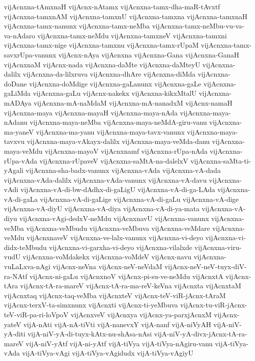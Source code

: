 {vijAcnxna-tAmxnaH
vijAcnx-nAtamx
vijAcnxna-tamx-dha-maR-tAvxtf
vijAcnxna-tamxnAM
vijAcnxna-tamxnU
vijAcnxna-tamxna
vijAcnxna-tamxnaH
vijAcnxna-tamx-nanunx
vijAcnxna-tamx-neMba
vijAcnxna-tamx-neMbu-vu-va-va-nAdaro
vijAcnxna-tamx-neMdu
vijAcnxna-tamxneV
vijAcnxna-tamxni
vijAcnxna-tamx-nige
vijAcnxna-tamxnu
vijAcnxna-tamx-rUpaM
vijAcnxna-tamx-savxrUpa-vanunx
vijAcnx-nAya
vijAcnxna
vijAcnxna-Gana
vijAcnxna-GanaH
vijAcnxnaM
vijAcnx-nada
vijAcnxna-daMte
vijAcnxna-daMteyU
vijAcnxna-dalilx
vijAcnxna-da-lilxruva
vijAcnxna-dhAre
vijAcnxna-diMda
vijAcnxna-doDane
vijAcnxna-doMdige
vijAcnxna-gaLanunx
vijAcnxna-gaLe
vijAcnxna-gaLiMda
vijAcnxna-gaLu
vijAcnx-nakekx
vijAcnxna-kikxMtalU
vijAcnxna-mADAya
vijAcnxna-mA-naMdaM
vijAcnxna-mA-nanadxM
vijAcnx-namaH
vijAcnxna-maya
vijAcnxna-mayaH
vijAcnxna-maya-nAda
vijAcnxna-maya-nAdanu
vijAcnxna-maya-neMba
vijAcnxna-maya-neMdA-giru-vanu
vijAcnxna-ma-yaneV
vijAcnxna-ma-yanu
vijAcnxna-maya-tavx-vanunx
vijAcnxna-maya-tavxvu
vijAcnxna-maya-vAkayx-dalilx
vijAcnxna-maya-veMda-danu
vijAcnxna-maya-veMdu
vijAcnxna-mayoV
vijAcnxnamf
vijAcnxna-rUpa-nAda
vijAcnxna-rUpa-vAda
vijAcnxna-rUpaveV
vijAcnxna-saMtA-na-dalelxV
vijAcnxna-saMta-ti-yAgali
vijAcnxna-sha-badx-vanunx
vijAcnxna-vAda
vijAcnxna-vA-dada
vijAcnxna-vAda-dalilx
vijAcnxna-vAda-vanunx
vijAcnxna-vA-davu
vijAcnxna-vAdi
vijAcnxna-vA-di-bw-dAdhx-di-gaLigU
vijAcnxna-vA-di-ga-LAda
vijAcnxna-vA-di-gaLa
vijAcnxna-vA-di-gaLige
vijAcnxna-vA-di-gaLu
vijAcnxna-vA-dige
vijAcnxna-vA-diyU
vijAcnxna-vA-diya
vijAcnxna-vA-di-ya-mata
vijAcnxna-vA-diyu
vijAcnxna-vAgi-dedxV-neMdu
vijAcnxnavU
vijAcnxna-vanunx
vijAcnxna-veMba
vijAcnxna-veMbudu
vijAcnxna-veMbuva
vijAcnxna-veMdare
vijAcnxna-veMdu
vijAcnxnaveV
vijAcnxna-ve-lalx-vanunx
vijAcnxna-vi-deyo
vijAcnxna-vi-didx-teMbudu
vijAcnxna-vi-garxha-vi-deyo
vijAcnxna-vilalxde
vijAcnxna-viru-vudU
vijAcnxna-voMdakekx
vijAcnxna-voMdeV
vijAcnx-navu
vijAcnxna-vuLaLxva-nAgi
vijAcnx-neVna
vijAcnx-neV-neVdaM
vijAcnx-neV-neV-tuyx-diV-ra-NAtf
vijAcnx-ni-gaLu
vijAcnxnoV
vijAcnx-pi-su-ve-neMdu
vijAcnxtA
vijAcnx-tAra
vijAcnx-tA-ra-mareV
vijAcnx-tA-ra-ma-reV-keVna
vijAcnxta
vijAcnxtaM
vijAcnxtaq
vijAcnx-taq-veMba
vijAcnxteV
vijAcnx-teV-viR-jAcnx-tAraM
vijAcnx-terxV-ta-simxnunx
vijAcnxti
vijAcnx-ti-yeMbuva
vijAcnx-tu-viR-jAcnx-teV-viR-pa-ri-loVpoV
vijAcnxveV
vijAcnxya
vijAcnx-ya-parxjAcnxM
vijAcnx-yateV
vijA-nAti
vijA-nA-tiVti
vijA-nanevxY
vijA-nanf
vijA-niVyAH
vijA-niV-yA-diti
vijA-niV-yA-di-tuyx-kAtx-nu-shAsa-nAsi
vijA-niV-yA-divx-jAcnx-tA-ra-mareV
vijA-niV-yAtf
vijA-ni-yAtf
vijA-tiVya
vijA-tiVya-nAgiru-vanu
vijA-tiVya-vAda
vijA-tiVya-vAgi
vijA-tiVya-vAgidudx
vijA-tiVya-vAgiyU
}
